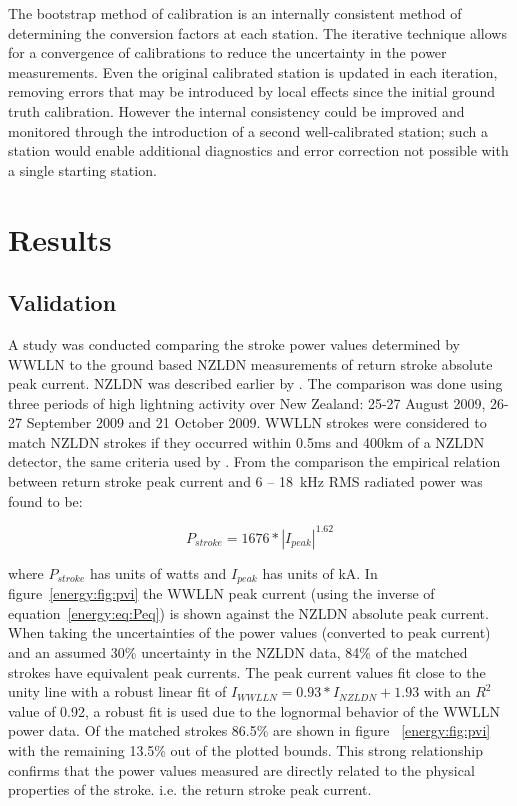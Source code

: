 The bootstrap method of calibration is an internally consistent method of determining the conversion factors at each station.
The iterative technique allows for a convergence of calibrations to reduce the uncertainty in the power measurements.
Even the original calibrated station is updated in each iteration, removing errors that may be introduced by local effects since the initial ground truth calibration.
However the internal consistency could be improved and monitored through the introduction of a second well-calibrated station; such a station would enable additional diagnostics and error correction not possible with a single starting station.

\section{Results}

\subsection{Validation}

A study was conducted comparing the stroke power values determined by WWLLN to the ground based NZLDN measurements of return stroke absolute peak current. NZLDN was described earlier by \citet{Rodger2006}.
The comparison was done using three periods of high lightning activity over New Zealand: 25-27 August 2009, 26-27 September 2009 and 21 October 2009.
WWLLN strokes were considered to match NZLDN strokes if they occurred within 0.5ms and 400km of a NZLDN detector, the same criteria used by \citet{Rodger2006}.
From the comparison the empirical relation between return stroke peak current and 6 -- 18~kHz RMS radiated power was found to be: 

\begin{equation}
P_{stroke} = 1676 * |I_{peak}|^{1.62}
\label{energy:eq:Peq}
\end{equation}

where $P_{stroke}$ has units of watts and $I_{peak}$ has units of kA.
In figure~\ref{energy:fig:pvi} the WWLLN peak current (using the inverse of equation~\ref{energy:eq:Peq}) is shown against the NZLDN absolute peak current.
When taking the uncertainties of the power values (converted to peak current) and an assumed 30\% uncertainty in the NZLDN data, 84\% of the matched strokes have equivalent peak currents.
The peak current values fit close to the unity line with a robust linear fit of $I_{WWLLN}=0.93*I_{NZLDN}+1.93$ with an $R^2$ value of 0.92, a robust fit is used due to the lognormal behavior of the WWLLN power data.
Of the matched strokes 86.5\% are shown in figure~ \ref{energy:fig:pvi} with the remaining 13.5\% out of the plotted bounds.
This strong relationship confirms that the power values measured are directly related to the physical properties of the stroke. i.e. the return stroke peak current.

